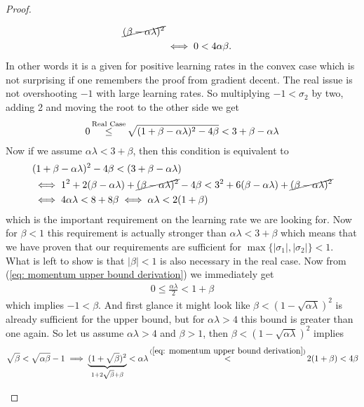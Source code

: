\begin{proof}
\begin{description}[wide, labelindent=0pt]
\begin{align*}
			\cancel{(\beta-\alpha\lambda)^2}\\
			&\iff 0 < 4\alpha\beta.
		\end{align*}
		In other words it is a given for positive learning rates in the convex	
		case which is not surprising if one remembers the proof from gradient
		decent. The real issue is not overshooting \(-1\) with large learning
		rates. So multiplying \(-1<\sigma_2\) by two, adding 2 and moving the
		root to the other side we get
		\begin{align*}
			0 \xle{\text{Real Case}} \sqrt{(1+\beta-\alpha\lambda)^2 - 4\beta}
			< 3+\beta-\alpha\lambda
		\end{align*}
		Now if we assume \(\alpha\lambda < 3+\beta\), then this condition is
		equivalent to 
		\begin{align}
			\nonumber
			&(1+\beta-\alpha\lambda)^2 - 4\beta < (3+\beta-\alpha\lambda)\\
			\nonumber
			&\iff 1^2 + 2(\beta-\alpha\lambda) + \cancel{(\beta-\alpha\lambda)^2} - 4\beta
			< 3^2 + 6(\beta-\alpha\lambda) + \cancel{(\beta-\alpha\lambda)^2}\\
			\label{eq: momentum upper bound derivation}
			&\iff 4\alpha\lambda < 8 + 8\beta
			\iff \alpha\lambda < 2(1+\beta)
		\end{align}
		which is the important requirement on the learning rate we are looking for.
		Now for \(\beta<1\) this requirement is actually stronger than
		\(\alpha\lambda <3+\beta\) which means that we have proven that our
		requirements are sufficient for \(\max\{|\sigma_1|,|\sigma_2|\}<1\).
		What is left to show is that \(|\beta|<1\) is also necessary in the real
		case. Now from (\ref{eq: momentum upper bound derivation}) we immediately
		get
		\begin{align*}
			0 \le \tfrac{\alpha\lambda}2 < 1+\beta
		\end{align*}
		which implies \(-1 < \beta\). And first glance it might look like
		\(\beta<(1-\sqrt{\alpha\lambda})^2\) is already sufficient for the upper
		bound, but for \(\alpha\lambda>4\) this bound is greater than one again.
		So let us assume \(\alpha\lambda>4\) and \(\beta>1\), then
		\(\beta<(1-\sqrt{\alpha\lambda})^2\) implies
		\begin{align*}
			\sqrt{\beta} < \sqrt{\alpha\beta} -1
			\implies \underbrace{(1+\sqrt{\beta})^2}_{1+2\sqrt{\beta} + \beta} < \alpha\lambda
			\stackrel{(\ref{eq: momentum upper bound derivation})}{<} 2(1+\beta) < 4\beta
		\end{align*}
 \end{description}
\end{proof}


\endinput